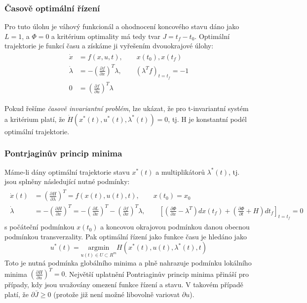 \subsubsection*{Časově optimální řízení}
Pro tuto úlohu je váhový funkcionál a ohodnocení koncového stavu dáno jako $ L = 1$, a $ \Phi = 0 $ a kritérium
optimality má tedy tvar $ J = t_f - t_0 $. Optimální trajektorie je funkcí času a získáme ji vyřešením dvouokrajové úlohy:
\begin{align*}
\begin{split}
\dot{x} &= f(x, u, t), \qquad x(t_0), x(t_f) \\
\dot{\lambda} &= - \left( \frac{\partial f}{\partial x} \right)^T \lambda, \qquad (\lambda^T f)_{t=t_f} = -1 \\
0 &= \left( \frac{\partial f}{\partial u} \right)^T \lambda
\end{split}
\end{align*}

Pokud řešíme \textit{časově invariantní problém}, lze ukázat, že pro t-invariantní systém a kritérium platí, že $ \dot{H}(x^*(t), u^*(t), \lambda^*(t)) = 0 $, tj. H je konstantní podél optimální trajektorie.

\subsubsection*{Pontrjaginův princip minima}
Máme-li dány optimální trajektorie stavu $ x^*(t) $ a multiplikátorů $ \lambda^*(t) $, tj. jsou splněny následující nutné podmínky:
\begin{align*}
\begin{split}
\dot{x}(t) &= \left( \frac{\partial H}{\partial \lambda} \right)^T = f(x(t), u(t), t), \qquad x(t_0) = x_0 \\
\dot{\lambda} &= - \left( \frac{\partial H}{\partial x} \right)^T = - \left( \frac{\partial L}{\partial x} \right)^T - \left( \frac{\partial f}{\partial x} \right)^T \lambda, \qquad \left[ \left( \frac{\partial \Phi}{\partial x} - \lambda^T \right) dx(t_f) + \left( \frac{\partial \Phi}{\partial t} + H \right) dt_f \right]_{t=t_f} = 0
\end{split}
\end{align*}
s počáteční podmínkou $ x(t_0) $ a koncovou okrajovou podmínkou danou obecnou podmínkou transverzality. Pak optimální řízení jako funkce času je hledáno jako
\begin{equation}
\boxed{u^*(t) = \underset{u(t) \in U \subset R^m}{\mathrm{argmin}} H(x^*(t), u(t), \lambda^*(t), t)}
\end{equation}
Toto je nutná podmínka globálního minima a plně nahrazuje podmínku lokálního minima $ \left(\frac{\partial H}{\partial u} \right)^T = 0 $. Největší uplatnění Pontriaginův princip minima přináší pro případy, kdy jsou uvažovány omezení funkce řízení a stavu. V takovém případě platí, že $ \partial \bar{J} \geq 0 $ (protože již není možné libovolně variovat $ \partial u $).

